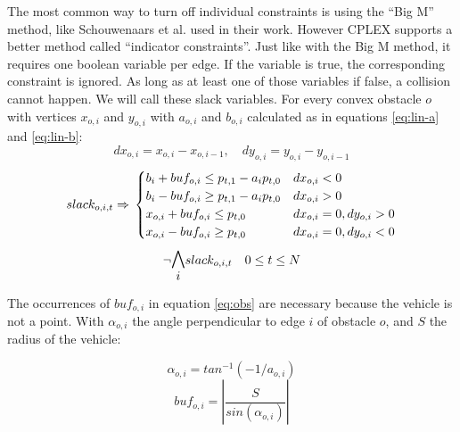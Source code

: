 The most common way to turn off individual constraints is using the ``Big M'' method, like Schouwenaars et al. \cite{Schouwenaars2001} used in their work. However CPLEX supports a better method called ``indicator constraints''. Just like with the Big M method, it requires one boolean variable per edge. If the variable is true, the corresponding constraint is ignored. As long as at least one of those variables if false, a collision cannot happen. We will call these slack variables. For every convex obstacle $o$ with vertices $x_{o,i}$ and $y_{o,i}$ with $a_{o,i}$ and $b_{o,i}$ calculated as in equations \ref{eq:lin-a} and \ref{eq:lin-b}:
\begin{equation*}
dx_{o,i} = x_{o,i} - x_{o,i-1}, \quad dy_{o,i} = y_{o,i} - y_{o,i-1}
\end{equation*}
\begin{equation}
\label{eq:obs}
slack_{o,i,t} \Rightarrow \\
\begin{cases}
b_i + buf_{o,i} \leq p_{t,1} - a_i p_{t,0} & dx_{o,i} < 0 \\
b_i - buf_{o,i}  \geq p_{t,1} - a_i p_{t,0} & dx_{o,i} > 0 \\
x_{o,i} + buf_{o,i}  \leq p_{t,0} & dx_{o,i} = 0, dy_{o,i} > 0 \\
x_{o,i} - buf_{o,i}  \geq p_{t,0} & dx_{o,i} = 0, dy_{o,i} < 0 \\
\end{cases}
\end{equation}
\begin{equation}
\neg \mathlarger{\mathlarger{\bigwedge_{i}}} slack_{o,i,t} \quad 0 \leq t \leq N
\end{equation}

The occurrences of $buf_{o,i}$ in equation \ref{eq:obs} are necessary because the vehicle is not a point. With $\alpha_{o,i}$ the angle perpendicular to edge $i$ of obstacle $o$, and $S$ the radius of the vehicle:

\begin{equation}
\alpha_{o,i} = tan^{-1}( -1 / a_{o,i})
\end{equation}
\begin{equation}
buf_{o,i} = |\dfrac{S}{sin(\alpha_{o,i})}|
\end{equation}